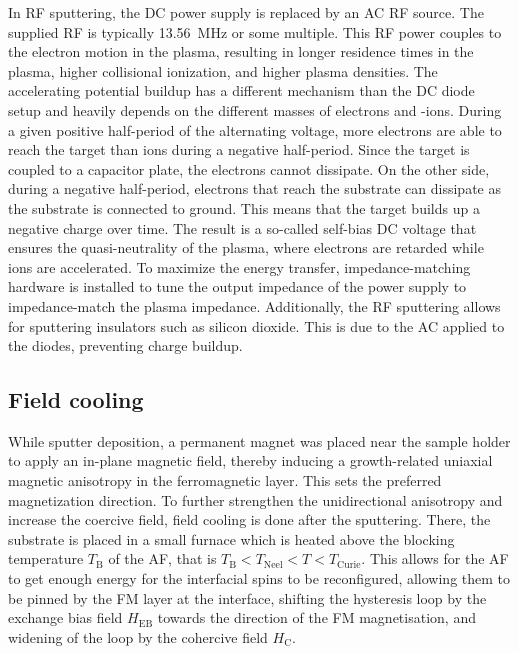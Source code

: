 In \ac{RF} sputtering, the \ac{DC} power supply is replaced by an \ac{AC} \ac{RF} source\cite{Seshan2012}.
The supplied \ac{RF} is typically \SI{13.56}{MHz} or some multiple\cite{Seshan2012}.
This \ac{RF} power couples to the electron motion in the plasma, resulting in longer residence times in the plasma, higher collisional ionization, and higher plasma densities\cite{Seshan2012}.
The accelerating potential buildup has a different mechanism than the \ac{DC} diode setup and heavily depends on the different masses of electrons and -ions.
During a given positive half-period of the alternating voltage, more electrons are able to reach the target than ions during a negative half-period\cite{Paetzold2004}.
Since the target is coupled to a capacitor plate, the electrons cannot dissipate\cite{Paetzold2004}.
On the other side, during a negative half-period, electrons that reach the substrate can dissipate as the substrate is connected to ground\cite{Paetzold2004}. 
This means that the target builds up a negative charge over time\cite{Paetzold2004}. 
The result is a so-called self-bias \ac{DC} voltage that ensures the quasi-neutrality of the plasma, where electrons are retarded while ions are accelerated\cite {Paetzold2004}.
To maximize the energy transfer, impedance-matching hardware is installed to tune the output impedance of the power supply to impedance-match the plasma impedance\cite{Seshan2012}.
Additionally, the \ac{RF} sputtering allows for sputtering insulators such as silicon dioxide.
This is due to the \ac{AC} applied to the diodes, preventing charge buildup\cite{Seshan2012}. 

\subsection{Field cooling}
While sputter deposition, a permanent magnet was placed near the sample holder to apply an in-plane magnetic field, thereby inducing a growth-related uniaxial magnetic anisotropy in the ferromagnetic layer.
This sets the preferred magnetization direction.
To further strengthen the unidirectional anisotropy and increase the coercive field, field cooling is done after the sputtering.
There, the substrate is placed in a small furnace which is heated above the blocking temperature $T_\mathrm{B}$ of the \ac{AF}, that is $T_\mathrm{B} < T_\mathrm{Neel} <T < T_\mathrm{Curie}$.
This allows for the \ac{AF} to get enough energy for the interfacial spins to be reconfigured, allowing them to be pinned by the \ac{FM} layer at the interface, shifting the hysteresis loop by the exchange bias field $H_\mathrm{EB}$ towards the direction of the \ac{FM} magnetisation, and widening of the loop by the cohercive field $H_\mathrm{C}$.

